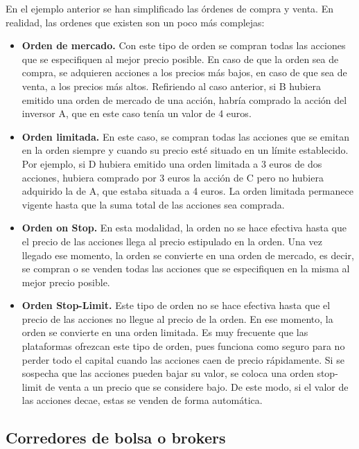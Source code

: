 		En el ejemplo anterior se han simplificado las \'ordenes de compra y venta. En realidad, las ordenes que existen son un poco m\'as complejas:
		\begin{itemize}
			
			\item \textbf{Orden de mercado.} Con este tipo de orden se compran todas las acciones que se especifiquen al mejor precio posible. En caso de que la orden sea de compra, se adquieren acciones a los precios m\'as bajos, en caso de que sea de venta, a los precios m\'as altos. Refiriendo al caso anterior, si B hubiera emitido una orden de mercado de una acci\'on, habría comprado la acci\'on del inversor A, que en este caso ten\'ia un valor de 4 euros.
			
			\item \textbf{Orden limitada.} En este caso, se compran todas las acciones que se emitan en la orden siempre y cuando su precio est\'e situado en un l\'imite establecido. Por ejemplo, si D hubiera emitido una orden limitada a 3 euros de dos acciones, hubiera comprado por 3 euros la acci\'on de C pero no hubiera adquirido la de A, que estaba situada a 4 euros. La orden limitada permanece vigente hasta que la suma total de las acciones sea comprada.
			
			\item \textbf{Orden on Stop.} En esta modalidad, la orden no se hace efectiva hasta que el precio de las acciones llega al precio estipulado en la orden. Una vez llegado ese momento, la orden se convierte en una orden de mercado, es decir, se compran o se venden todas las acciones que se especifiquen en la misma al mejor precio posible.
			
			\item \textbf{Orden Stop-Limit.} Este tipo de orden no se hace efectiva hasta que el precio de las acciones no llegue al precio de la orden. En ese momento, la orden se convierte en una orden limitada. Es muy frecuente que las plataformas ofrezcan este tipo de orden, pues funciona como seguro para no perder todo el capital cuando las acciones caen de precio r\'apidamente. Si se sospecha que las acciones pueden bajar su valor, se coloca una orden stop-limit de venta a un precio que se considere bajo. De este modo, si el valor de las acciones decae, estas se venden de forma autom\'atica. 
			
		\end{itemize} 
		
		\subsection{Corredores de bolsa o brokers}
	
